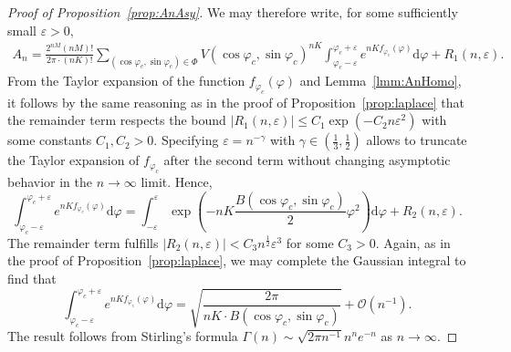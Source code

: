 \documentclass[10pt,a4paper]{amsart}
\newcommand{\bigO}{\mathcal{O}}
\newcommand{\dd}{\mathrm{d}}
\begin{document}
\begin{proof}[Proof of Proposition~\ref{prop:AnAsy}]
We may therefore write, for some sufficiently small $\varepsilon > 0$,
\begin{gather*}
A_n = \frac{2^{nM} (nM)! }{ 2\pi \cdot (nK)!} 
\sum_{(\cos \varphi_c,\sin \varphi_c) \in \Phi}
\!\!\!V(\cos \varphi_c, \sin \varphi_c)^{nK}
\int_{\varphi_c-\varepsilon}^{\varphi_c+\varepsilon} e^{nK f_{\varphi_c}(\varphi)} \dd \varphi + R_1(n,\varepsilon).
\end{gather*}
From the Taylor expansion of the function $f_{\varphi_c}(\varphi)$ and
Lemma~\ref{lmm:AnHomo},
it follows by the same reasoning as in the proof of Proposition~\ref{prop:laplace} that the remainder term respects the bound
$|R_1(n,\varepsilon)| \leq C_1 \exp({-C_2 n \varepsilon^2})$
with some constants $C_1,C_2>0$.
Specifying $\varepsilon = n^{-\gamma}$ with $\gamma \in (\frac13,\frac12)$ allows to truncate the Taylor expansion of $f_{\varphi_c}$ after the second term without changing asymptotic behavior in the $n\rightarrow \infty$ limit. Hence,
$$
\int_{\varphi_c-\varepsilon}^{\varphi_c+\varepsilon} e^{nK f_{\varphi_c}(\varphi)} \dd \varphi =
\int_{-\varepsilon}^{\varepsilon} \exp\left(-nK \frac{B(\cos\varphi_c,\sin \varphi_c)}{2} \varphi^2\right) \dd \varphi + R_2(n, \varepsilon).
$$
The remainder term fulfills $|R_2(n, \varepsilon)| < C_3 n^{\frac12} \varepsilon^3$ for some $C_3>0$.
Again, as in the proof of Proposition~\ref{prop:laplace}, we may complete the Gaussian integral to find that 
$$
\int_{\varphi_c-\varepsilon}^{\varphi_c+\varepsilon} e^{nK f_{\varphi_c}(\varphi)} \dd \varphi = \sqrt{ \frac{2\pi}{nK \cdot B(\cos\varphi_c,\sin \varphi_c)}} + \bigO (n^{-1}).
$$
The result follows from Stirling's formula $\Gamma(n) \sim \sqrt{2\pi n^{-1}} n^n e^{-n}$ as $n \rightarrow \infty$.
\end{proof}
\end{document}
